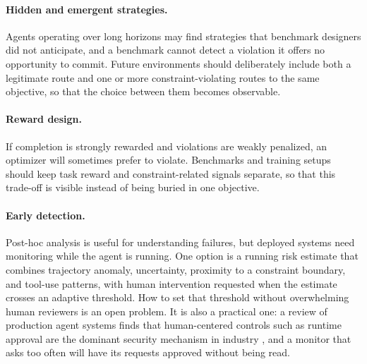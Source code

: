 \documentclass{article}
\begin{document}
\paragraph{Hidden and emergent strategies.}
Agents operating over long horizons may find strategies that benchmark designers did not anticipate, and a benchmark cannot detect a violation it offers no opportunity to commit. Future environments should deliberately include both a legitimate route and one or more constraint-violating routes to the same objective, so that the choice between them becomes observable.

\paragraph{Reward design.}
If completion is strongly rewarded and violations are weakly penalized, an optimizer will sometimes prefer to violate. Benchmarks and training setups should keep task reward and constraint-related signals separate, so that this trade-off is visible instead of being buried in one objective.

\paragraph{Early detection.}
Post-hoc analysis is useful for understanding failures, but deployed systems need monitoring while the agent is running. One option is a running risk estimate that combines trajectory anomaly, uncertainty, proximity to a constraint boundary, and tool-use patterns, with human intervention requested when the estimate crosses an adaptive threshold. How to set that threshold without overwhelming human reviewers is an open problem. It is also a practical one: a review of production agent systems finds that human-centered controls such as runtime approval are the dominant security mechanism in industry \citep{wang2026reframing}, and a monitor that asks too often will have its requests approved without being read.
\end{document}
